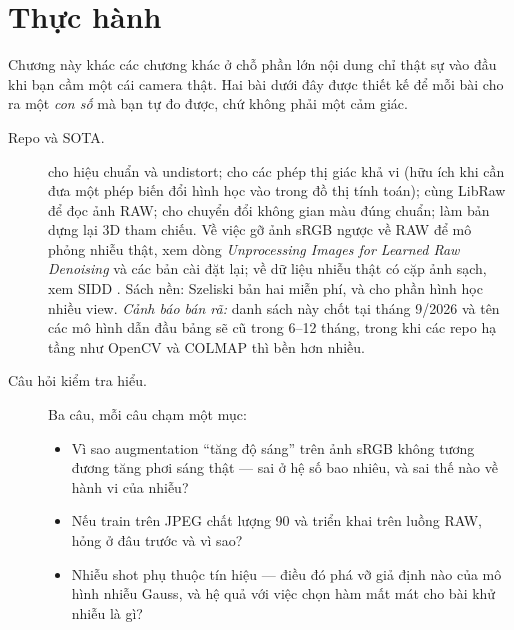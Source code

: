 \documentclass[../../deep_learning.tex]{subfiles}
\begin{document}






\section{Thực hành}
Chương này khác các chương khác ở chỗ phần lớn nội dung chỉ thật sự vào đầu khi bạn cầm một cái camera thật. Hai bài dưới đây được thiết kế để mỗi bài cho ra một \emph{con số} mà bạn tự đo được, chứ không phải một cảm giác.

\begin{description}
\item[Repo và SOTA.]  cho hiệu chuẩn và undistort;  cho các phép thị giác khả vi (hữu ích khi cần đưa một phép biến đổi hình học vào trong đồ thị tính toán);  cùng LibRaw để đọc ảnh RAW;  cho chuyển đổi không gian màu đúng chuẩn;  \cite{schoenberger2016colmap} làm bản dựng lại 3D tham chiếu. Về việc gỡ ảnh sRGB ngược về RAW để mô phỏng nhiễu thật, xem dòng \emph{Unprocessing Images for Learned Raw Denoising} \cite{brooks2019unprocessing} và các bản cài đặt lại; về dữ liệu nhiễu thật có cặp ảnh sạch, xem SIDD \cite{abdelhamed2018sidd}. Sách nền: Szeliski \cite{szeliski2022} bản hai miễn phí, và \cite{hartley2004} cho phần hình học nhiều view. \emph{Cảnh báo bán rã:} danh sách này chốt tại tháng 9/2026 và tên các mô hình dẫn đầu bảng sẽ cũ trong 6--12 tháng, trong khi các repo hạ tầng như OpenCV và COLMAP thì bền hơn nhiều.
\item[Câu hỏi kiểm tra hiểu.] Ba câu, mỗi câu chạm một mục:
  \begin{itemize}
  \item Vì sao augmentation ``tăng độ sáng'' trên ảnh sRGB không tương đương tăng phơi sáng thật --- sai ở hệ số bao nhiêu, và sai thế nào về hành vi của nhiễu?
  \item Nếu train trên JPEG chất lượng 90 và triển khai trên luồng RAW, hỏng ở đâu trước và vì sao?
  \item Nhiễu shot phụ thuộc tín hiệu --- điều đó phá vỡ giả định nào của mô hình nhiễu Gauss, và hệ quả với việc chọn hàm mất mát cho bài khử nhiễu là gì?
  \end{itemize}
\end{description}
\end{document}
